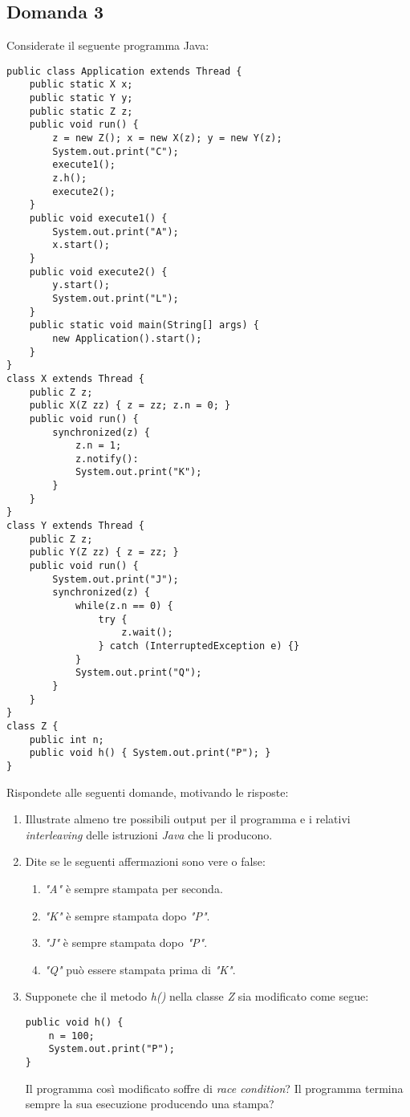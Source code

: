 \subsection{Domanda 3}
Considerate il seguente programma Java:
\begin{lstlisting}
public class Application extends Thread {
	public static X x;
	public static Y y;
	public static Z z;
	public void run() {
		z = new Z(); x = new X(z); y = new Y(z);
		System.out.print("C");
		execute1();
		z.h();
		execute2();
	}
	public void execute1() {
		System.out.print("A");
		x.start();
	}
	public void execute2() {
		y.start();
		System.out.print("L");
	}
	public static void main(String[] args) {
		new Application().start();
	}
}
class X extends Thread {
	public Z z;
	public X(Z zz) { z = zz; z.n = 0; }
	public void run() {
		synchronized(z) {
			z.n = 1;
			z.notify():
			System.out.print("K");
		}
	}
}
class Y extends Thread {
	public Z z;
	public Y(Z zz) { z = zz; }
	public void run() {
		System.out.print("J");
		synchronized(z) {
			while(z.n == 0) {
				try {
					z.wait();
				} catch (InterruptedException e) {}
			}
			System.out.print("Q");
		}
	}
}
class Z {
	public int n;
	public void h() { System.out.print("P"); }
}
\end{lstlisting}
Rispondete alle seguenti domande, motivando le risposte:
\begin{enumerate}
	\item Illustrate almeno tre possibili output per il programma e i relativi \textit{interleaving} delle istruzioni \textit{Java} che li producono.
	\item Dite se le seguenti affermazioni sono vere o false:
	\begin{enumerate}
		\item \textit{"A"} \`e sempre stampata per seconda.
		\item \textit{"K"} \`e sempre stampata dopo \textit{"P"}.
		\item \textit{"J"} \`e sempre stampata dopo \textit{"P"}.
		\item \textit{"Q"} pu\`o essere stampata prima di \textit{"K"}.
	\end{enumerate}
	\item Supponete che il metodo \textit{h()} nella classe \textit{Z} sia modificato come segue:
\begin{lstlisting}
public void h() {
	n = 100;
	System.out.print("P");
}
\end{lstlisting}
	Il programma cos\`i modificato soffre di \textit{race condition}? Il programma termina sempre la sua esecuzione producendo una stampa?
\end{enumerate}

